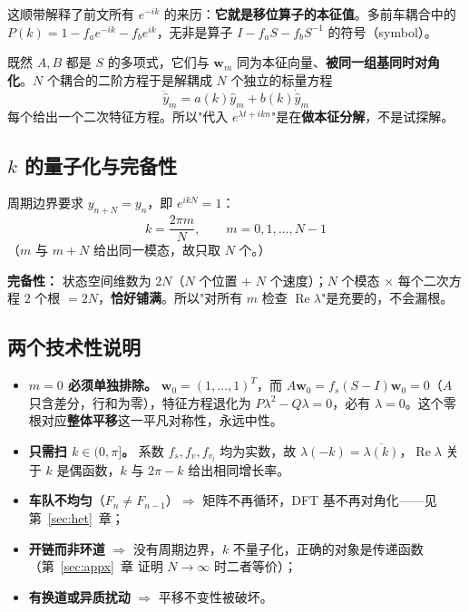 \documentclass[11pt,a4paper,openany]{book}
\numberwithin{equation}{chapter}
\numberwithin{figure}{chapter}
\numberwithin{table}{chapter}
\begin{document}
\begin{tcolorbox}[notebox]
这顺带解释了前文所有 $e^{-ik}$ 的来历：\textbf{它就是移位算子的本征值}。多前车耦合中的 $P(k)=1-f_ae^{-ik}-f_be^{ik}$，无非是算子 $I-f_aS-f_bS^{-1}$ 的符号（symbol）。
\end{tcolorbox}

既然 $A,B$ 都是 $S$ 的多项式，它们与 $\mathbf w_m$ 同为本征向量、\textbf{被同一组基同时对角化}。$N$ 个耦合的二阶方程于是解耦成 $N$ 个独立的标量方程
\begin{equation}
\ddot{\hat y}_m = a(k)\hat y_m + b(k)\dot{\hat y}_m
\end{equation}
每个给出一个二次特征方程。所以"代入 $e^{\lambda t+ikn}$"是在\textbf{做本征分解}，不是试探解。

\subsection{$k$ 的量子化与完备性}

周期边界要求 $y_{n+N}=y_n$，即 $e^{ikN}=1$：
\begin{equation}
k = \frac{2\pi m}{N},\qquad m=0,1,\dots,N-1
\end{equation}
（$m$ 与 $m+N$ 给出同一模态，故只取 $N$ 个。）

\textbf{完备性：} 状态空间维数为 $2N$（$N$ 个位置 $+$ $N$ 个速度）；$N$ 个模态 $\times$ 每个二次方程 $2$ 个根 $=2N$，\textbf{恰好铺满}。所以"对所有 $m$ 检查 $\operatorname{Re}\lambda$"是充要的，不会漏根。

\subsection{两个技术性说明}

\begin{itemize}[leftmargin=1.4em,itemsep=4pt]
\item \textbf{$m=0$ 必须单独排除。} $\mathbf w_0=(1,\dots,1)^T$，而 $A\mathbf w_0=f_s(S-I)\mathbf w_0=0$（$A$ 只含差分，行和为零），特征方程退化为 $P\lambda^2-Q\lambda=0$，必有 $\lambda=0$。这个零根对应\textbf{整体平移}这一平凡对称性，永远中性。
\item \textbf{只需扫 $k\in(0,\pi]$。} 系数 $f_s,f_v,f_{v_l}$ 均为实数，故 $\lambda(-k)=\overline{\lambda(k)}$，$\operatorname{Re}\lambda$ 关于 $k$ 是偶函数，$k$ 与 $2\pi-k$ 给出相同增长率。
\end{itemize}

\begin{tcolorbox}[notebox,title=\textbf{什么时候这个假设失效}]
\begin{itemize}[leftmargin=1.2em,itemsep=2pt]
\item \textbf{车队不均匀}（$F_n\ne F_{n-1}$）$\Rightarrow$ 矩阵不再循环，DFT 基不再对角化——见 第~\ref{sec:het}~章；
\item \textbf{开链而非环道} $\Rightarrow$ 没有周期边界，$k$ 不量子化，正确的对象是传递函数（第~\ref{sec:appx}~章 证明 $N\to\infty$ 时二者等价）；
\item \textbf{有换道或异质扰动} $\Rightarrow$ 平移不变性被破坏。
\end{itemize}
\end{tcolorbox}
\end{document}
